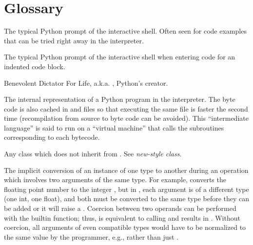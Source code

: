 \chapter{Glossary\label{glossary}}


\begin{description}


\index{>>>}
\item[\code{>>>}]
The typical Python prompt of the interactive shell.  Often seen for
code examples that can be tried right away in the interpreter.

\item[\code{.\code{.}.}]
The typical Python prompt of the interactive shell when entering code
for an indented code block.

\item[BDFL]
Benevolent Dictator For Life, a.k.a. , Python's creator.

\item[byte code]
The internal representation of a Python program in the interpreter.
The byte code is also cached in  and 
files so that executing the same file is faster the second time
(recompilation from source to byte code can be avoided).  This
``intermediate language'' is said to run on a ``virtual
machine'' that calls the subroutines corresponding to each bytecode.

\item[classic class]
Any class which does not inherit from .  See
\emph{new-style class}.

\item[coercion]
The implicit conversion of an instance of one type to another during an
operation which involves two arguments of the same type.  For example,
{} converts the floating point number to the integer
{}, but in {}, each argument is of a different type (one
int, one float), and both must be converted to the same type before they can
be added or it will raise a {}.  Coercion between two
operands can be performed with the {} builtin function; thus,
{} is equivalent to calling {} and results in {}.  Without coercion,
all arguments of even compatible types would have to be normalized to the
same value by the programmer, e.g., {} rather than just
{}.


\end{description}
